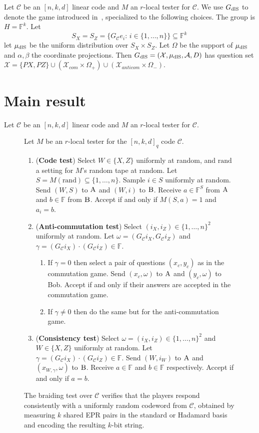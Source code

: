\documentclass[11pt]{article}
\theoremstyle{definition}
\newcommand{\code}{\mathcal{C}}
\newcommand{\field}{\mathbb{F}}
\newcommand{\dlS}{\ensuremath{\rm dlS}}
\newcommand{\mA}{\ensuremath{\mathcal{A}}}
\newcommand{\mX}{\ensuremath{\mathcal{X}}}
\newcommand{\rand}{\textrm{rand}}
\newcommand{\labelstyle}[1]{\ensuremath{\textsc{#1}}\xspace}
\newcommand{\alice}{\labelstyle{A}}
\newcommand{\bob}{\labelstyle{B}}
\newenvironment{gamespec}{
  \begin{mdframed}[style=figstyle]}{
  \end{mdframed}}
\begin{document}
Let $\code$ be an $[n,k,d]$ linear code and $M$ an $r$-local tester for $\code$. 
We use $G_{\dlS}$ to denote the game introduced in~\cite[Section 3.4]{de2022spectral}, specialized to the following choices. The group is $H=\field^k$. Let
\[ S_X=S_Z=\{G_\code e_i:\,i\in\{1,\ldots,n\}\}\subseteq \field^k\,\]
let $\mu_{\dlS}$ be the uniform distribution over $S_X\times S_Z$. Let $\Omega$ be the support of $\mu_{\dlS}$ and $\alpha,\beta$ the coordinate projections. Then $G_{\dlS}=(\mX,\mu_{\dlS},\mA,D)$ has question set $\mX = \{PX,PZ\} \cup (\mX_{com}\times \Omega_+) \cup (\mX_{anticom} \times \Omega_-)$. 


\section{Main result}

Let $\code$ be an $[n,k,d]$ linear code and $M$ an $r$-local tester for $\code$. 


\begin{figure}[!htbp]
  \centering
  \begin{gamespec}
Let $M$ be an $r$-local tester for the $[n,k,d]_q$ code $\code$. 
    \begin{enumerate}
      \setlength\itemsep{1pt}
    \item (\textbf{Code test}) Select $W\in \{X,Z\}$ uniformly at random, and $\rand$ a setting for $M$'s random tape at random. Let $S=M(\rand)\subseteq\{1,\ldots,n\}$. Sample $i\in S$ uniformly at random. Send $(W,S)$ to $\alice$ and $(W,i)$ to $\bob$. Receive $a\in \field^S$ from $\alice$ and $b\in \field$ from $\bob$. Accept if and only if $M(S,a)=1$ and $a_i = b$.  
    \item (\textbf{Anti-commutation test}) Select $(i_X,i_Z)\in \{1,\ldots,n\}^2 $ uniformly at random. Let $\omega = (G_\code i_X, G_\code i_Z)$ and $\gamma =  (G_\code i_X) \cdot(G_\code {i_Z}) \in \field$.
		\begin{enumerate}
		\item If $\gamma=0$ then select a pair of questions $(x_c,y_c)$ as in the commutation game. Send $(x_c,\omega)$ to $\alice$ and $(y_c,\omega)$ to Bob. Accept if and only if their answers are accepted in the commutation game. 
		\item If $\gamma\neq 0$ then do the same but for the anti-commutation game. 
		\end{enumerate} 
		 \item (\textbf{Consistency test}) Select $\omega=(i_X,i_Z)\in \{1,\ldots,n\}^2 $ and $W\in \{X,Z\}$ uniformly at random. Let $\gamma = (G_\code i_X) \cdot(G_\code {i_Z}) \in \field$. Send $(W,i_W)$ to $\alice$ and $(x_{W,\gamma},\omega)$ to $\bob$. Receive $a\in \field$ and $b\in \field$ respectively. Accept if and only if $a=b$. 
    \end{enumerate}
  \end{gamespec}
  \caption{The braiding test over $\code$ verifies that the players respond consistently with a uniformly random codeword from $\code$, obtained by measuring $k$ shared EPR pairs in the standard or Hadamard basis and encoding the resulting $k$-bit string.}
  \label{fig:braiding-test}
\end{figure}
\end{document}

